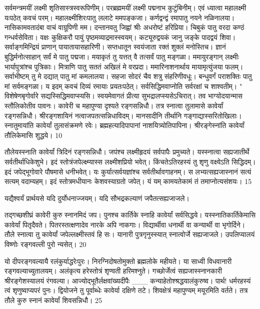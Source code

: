सर्वमन्त्रमयीं लक्ष्मी शृतिसास्त्रस्वरूपिणीम्।
परब्रह्ममयीं लक्ष्मी पद्मनाभ कुटुंबिनीम्।
एवं ध्यात्वा महालक्ष्मी यःपठेत् कवचं परम्।
महालक्ष्मीशिरःपातु ललाटे ममपङ्कजा।
कर्णद्वन्द्वं रमापातु नयने नळिनालया।
नासिकामवतादंबा वाचं वाग्रूपिणी मम।
दन्तानवतु जिह्वां श्रीः अधरोष्टं हरिप्रिया।
चिबुकं पातु वरदा कण्ठं गन्धर्वसेविता।
वक्षः कुक्षिकरौ पायुं पृष्ठमव्याद्रमास्स्वयम्।
कट्यूरुद्वयकं जानु जङ्के पादद्वयं शिवा।
सर्वाङ्गमिन्द्रियं प्राणान् पायातायासहारिणी।
सप्तधातून स्वयंजाता रक्तं शुक्लं मनोस्तिच।
ज्ञानं बुद्धिर्मनोत्साहान् सर्वं मे पातु पद्मजा।
मयाकृतं तु यत्तत् वै तत्सर्वं पातु मङ्गळा।
ममायुरङ्गान् लक्ष्मीः भार्यापुत्रांश्च पुत्रिकाः।
मित्राणि पातु सततं अखिलं मे वरप्रदा।
ममारिनाशनार्थाय मायामृत्युंजया फलम्।
सर्वाभीष्टम् तु मे दद्यात् पातु मां कमलालया।
सहजा सोदरं चैव शत्रु संहरिणीवधूः।
बन्धुवर्गं पराशक्तिः पातु मां सर्वमङ्गळा।
य इदम् कवचं दिव्यं रमायाः प्रयतःपठेत्।
सर्वसिद्धिमवाप्नोति सर्वरक्षां च शाश्वतीम्।
"
विशेषेणबृगोर्वारे सद्यस्सिद्धिमवाप्स्यसि।
स्वयमेवागतं प्रीत्या सुभद्रालप्स्यसेऽचिरात्।
तव भाग्योदयान्मास स्तौलिकोतीव पावनः।
कावेरी च महापुण्या दृश्यते रङ्गसन्निधौ।
तत्र स्नात्वा तुलामासे कावेर्यां रङ्गसन्निधौ।
श्रीरङ्गशायिनं नत्वाजपतत्सन्निधाविदम्।
मानसादीनि तीर्थानि गङ्गाद्यास्सरितोखिलाः।
स्नातुमायांति कावेर्यां तुलासंक्रमणे रवेः।
ब्रह्महत्यादिपापानां नाशयित्र्योतिपापिना।
श्रीरङ्गेस्नांति कावेर्यां तौलिकेमासि शुद्धये।
10

तौलेयस्स्नाति कावेर्यां त्रिदिनं रङ्गसन्निधौ।
जपंश्च लक्ष्मीहृदयं सर्वपापैः प्रमुच्यते।
यस्स्नात्वा सह्यजातीर्थे सर्वतीर्थाधिकेशुभे।
इदं स्तोत्रंजपेल्क्ष्म्यास्स लक्ष्मीशप्रियो भवेत्।
किंचतेऽतिरहस्यं तु शृणु वक्ष्येऽति सिद्धिदम्।
इदं जपेद्भूगोवारे पौषमासे धनीभवेत्।
यः कुर्यात्सर्वयज्ञांश्च सर्वतीर्थावगाहनम्।
स लभ्यत्सह्यजास्नानं सत्यं सत्यम् वदाम्यहम्।
इदं स्तोत्रमधीयानः केशवस्याग्रतो जपेत्।
यं यम् कामयतेकामं तं तमाप्नोत्यसंशयः।
15

यद्यैश्वर्यं प्रार्थयसे यदि दुर्योधनाज्जयम्।
यदि सौभद्रकल्याणं जपैतत्सह्यजाजले।

तद्गच्छशीघ्रं कावेरी कुरु स्नानमिदं जप।
पुनश्च कार्तिके स्नाहि कावेर्यां सर्वसिद्धये।
यस्स्नातिकार्तिकेमासि कावेर्यां पितृदैवते।
पितरस्तत्क्षणादेव नारके अपि नाकगाः।
विद्यार्थीवा धनार्थी वा कन्यार्थी वा भृगोर्दिने।
तौले स्नात्वा तु कावेर्यां जपेल्लक्ष्मीस्तवं हि सः।
यानारी पुत्रगृनुस्स्यात् स्नात्वोर्जे सह्यजाजले।
उपलिप्यालयं विष्णोः रङ्गवल्ली पुरो न्यसेत्।
20

यो दीपरङ्गवल्यायै रलंकुर्याद्धरेःपुरः।
निरग्निदोषतोमुक्तो ब्रह्मलोके महीयते।
या साध्वी विधवानारी रङ्गवल्याच्युतालयम्।
अलंकृत्य हरेस्तोत्रं शृण्वती हरिमश्नुते।
गच्छोर्जेत्वं सह्यजास्स्नानकारी
श्रीरङ्गेशस्यालयं रंगवल्या।
आज्योद्भूतैर्लक्षवांख्यदीपैः
___ कन्याहेतोश्श्रद्धयालंकुरुष्व।
पार्थ! धर्मरहस्यं त्वं शृणुष्वाप्यपरं पुनः।
द्वियोजने तु पूर्वाब्धेः कावेर्या दक्षिणे तटे।
शिवक्षेत्रं महापुण्यम् मयूरमिति वर्तते।
तत्र तौले कुरु स्नानं कावेर्यां शिवसन्निधौ।
25

